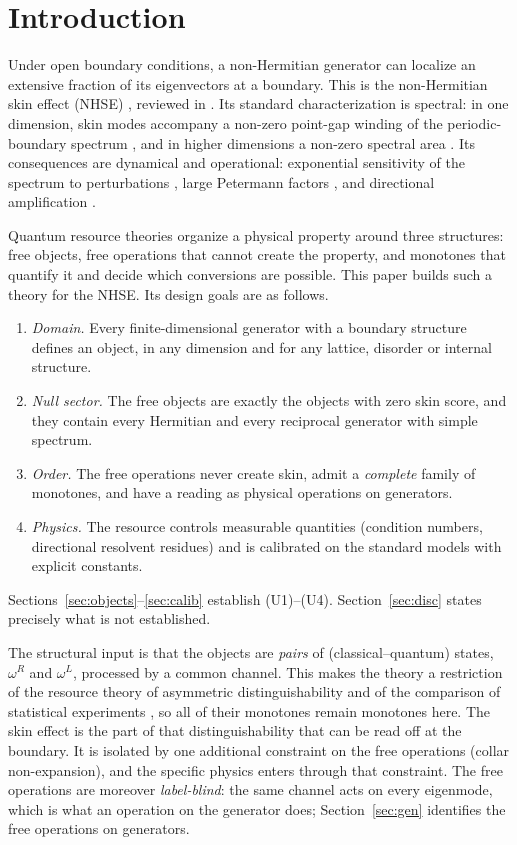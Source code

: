 \documentclass[11pt]{article}
\theoremstyle{definition}
\theoremstyle{remark}
\begin{document}
\section{Introduction}
\label{sec:intro}

Under open boundary conditions, a non-Hermitian generator can localize an extensive fraction of its eigenvectors at a boundary. This is the non-Hermitian skin effect (NHSE) \cite{HN96,YW18,KEBB18,LT19,YM19,OKSS20,ZYF20,ZYF22}, reviewed in \cite{AGU20,BBK21}. Its standard characterization is spectral: in one dimension, skin modes accompany a non-zero point-gap winding of the periodic-boundary spectrum \cite{OKSS20,ZYF20}, and in higher dimensions a non-zero spectral area \cite{ZYF22}. Its consequences are dynamical and operational: exponential sensitivity of the spectrum to perturbations \cite{TE05,BB20}, large Petermann factors \cite{Pet79}, and directional amplification \cite{Por19,WBN20}.

Quantum resource theories \cite{CG19,CFS16} organize a physical property around three structures: free objects, free operations that cannot create the property, and monotones that quantify it and decide which conversions are possible. This paper builds such a theory for the NHSE. Its design goals are as follows.
\begin{enumerate}
\item[(U1)] \emph{Domain.} Every finite-dimensional generator with a boundary structure defines an object, in any dimension and for any lattice, disorder or internal structure.
\item[(U2)] \emph{Null sector.} The free objects are exactly the objects with zero skin score, and they contain every Hermitian and every reciprocal generator with simple spectrum.
\item[(U3)] \emph{Order.} The free operations never create skin, admit a \emph{complete} family of monotones, and have a reading as physical operations on generators.
\item[(U4)] \emph{Physics.} The resource controls measurable quantities (condition numbers, directional resolvent residues) and is calibrated on the standard models with explicit constants.
\end{enumerate}
Sections~\ref{sec:objects}--\ref{sec:calib} establish (U1)--(U4). Section~\ref{sec:disc} states precisely what is not established.

The structural input is that the objects are \emph{pairs} of (classical--quantum) states, $\omega^R$ and $\omega^L$, processed by a common channel. This makes the theory a restriction of the resource theory of asymmetric distinguishability \cite{WW19} and of the comparison of statistical experiments \cite{Bla53,Bus12}, so all of their monotones remain monotones here. The skin effect is the part of that distinguishability that can be read off at the boundary. It is isolated by one additional constraint on the free operations (collar non-expansion), and the specific physics enters through that constraint. The free operations are moreover \emph{label-blind}: the same channel acts on every eigenmode, which is what an operation on the generator does; Section~\ref{sec:gen} identifies the free operations on generators.
\end{document}
